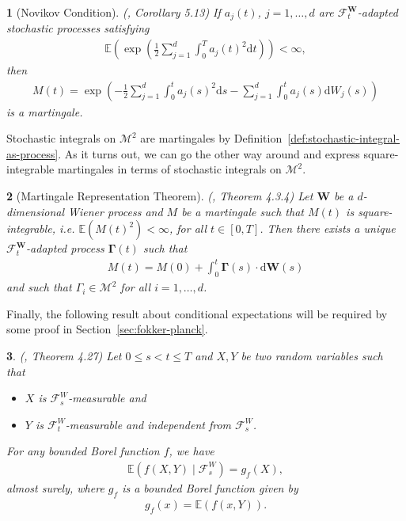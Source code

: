 \documentclass[english]{article}
\numberwithin{equation}{section}
\numberwithin{figure}{section}
\theoremstyle{bolddescit}
\newtheorem{theorem}{\protect\theoremname}[section]
\theoremstyle{definition}
\theoremstyle{definition}
\theoremstyle{plain}
\theoremstyle{plain}
\theoremstyle{bolddesc}
\theoremstyle{plain}
\theoremstyle{remark}
\providecommand{\theoremname}{Theorem}
\begin{document}
\begin{theorem}[Novikov Condition]\label{thm:novikov}
  (\cite{karatzas_brownian_1998}, Corollary 5.13)
  If $a_j(t)$, $j=1,\ldots,d$ are $\mathcal{F}^\mathbf{W}_t$-adapted stochastic processes satisfying
  \begin{align*}
    \mathbb{E}\left(\exp \left(\frac{1}{2} \sum_{j=1}^d \int_0^T a_j(t)^2 \mathrm{d}t\right)\right) < \infty,
  \end{align*}
  then
  \begin{align*}
    M(t) = \exp \left( - \frac{1}{2} \sum_{j=1}^{d} \int_0^t a_j(s)^2 \mathrm{d}s - \sum_{j=1}^{d} \int_0^t a_j(s) \mathrm{d}W_j(s) \right)
  \end{align*}
  is a martingale.
\end{theorem}

Stochastic integrals on $\mathcal{M}^2$ are martingales by Definition~\ref{def:stochastic-integral-as-process}. As it turns out, we can go the other way around and express square-integrable martingales in terms of stochastic integrals on $\mathcal{M}^2$.

\begin{theorem}[Martingale Representation Theorem]\label{thm:martingale-representation}
  (\cite{oksendal_stochastic_2003}, Theorem 4.3.4)
  Let $\mathbf{W}$ be a $d$-dimensional Wiener process and $M$ be a martingale such that $M(t)$ is square-integrable, i.e. $\mathbb{E}(M(t)^2) < \infty$, for all $t \in [0,T]$. Then there exists a unique $\mathcal{F}^\mathbf{W}_t$-adapted process $\mathbf{\Gamma}(t)$ such that
  \begin{align*}
    M(t) = M(0) + \int_0^t \mathbf{\Gamma}(s) \cdot \mathrm{d}\mathbf{W}(s)
  \end{align*}
  and such that $\Gamma_i \in \mathcal{M}^2$ for all $i=1,\ldots,d$.
\end{theorem}

Finally, the following result about conditional expectations will be required by some proof in Section~\ref{sec:fokker-planck}.

\begin{theorem}\label{thm:cond-exp-measurable-independent}
  (\cite{kopp_probability_2013}, Theorem 4.27)
  Let $0 \le s < t \le T$ and $X, Y$ be two random variables such that
  \begin{itemize}
    \item $X$ is $\mathcal{F}^W_s$-measurable and
    \item $Y$ is $\mathcal{F}^W_t$-measurable and independent from $\mathcal{F}^W_s$.
  \end{itemize}
  For any bounded Borel function $f$, we have
  \begin{align*}
    \mathbb{E}(f(X,Y) \mid \mathcal{F}^W_s) = g_f(X),
  \end{align*}
  almost surely, where $g_f$ is a bounded Borel function given by
  \begin{align*}
    g_f(x) = \mathbb{E}(f(x,Y)).
  \end{align*}
\end{theorem}
\end{document}
